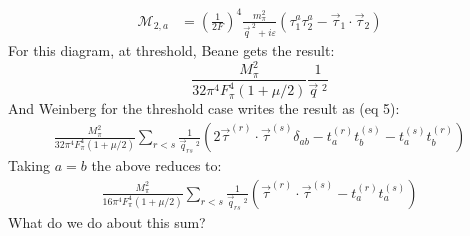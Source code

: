 \documentclass[11pt]{article}
\newcommand\ddfrac[2]{\frac{\displaystyle #1}{\displaystyle #2}}
\newcommand{\note}[1]{\color{red} #1 \color{black}}
\newcommand\mm{\mathcal{M}}
\begin{document}
\begin{align}
    \mm_{2,a} &= \left( \frac{1}{2 F}  \right)^4 
    \ddfrac{m_\pi^2}{\vec{q}^{\;2}+i \varepsilon} \left( \tau_1^a \tau_2^a-\vec{\tau}_1 \cdot \vec{\tau}_2 \right)
\end{align}
For this diagram, at threshold, Beane gets the result:
\begin{equation}
    \frac{M_\pi^2}{32\pi^4 F_\pi^4 (1+ \mu/2)} \frac{1}{\vec{q}\;^2} 
\end{equation}
And Weinberg for the threshold case writes the result as (eq 5):
\begin{align}
    \frac{M_\pi^2}{32\pi^4 F_\pi^4 (1+ \mu/2)}\sum_{r<s} \frac{1}{\vec{q}_{rs}\;^2}  \left( 2 \vec{\tau}^{(r)} \cdot \vec{\tau}^{(s)} \delta_{ab}-t_a^{(r)} t_b^{(s)} - t_a^{(s)} t_b^{(r)} \right)
\end{align}
Taking $a=b$ the above reduces to:
\begin{align}
    \frac{M_\pi^2}{16\pi^4 F_\pi^4 (1+ \mu/2)}\sum_{r<s} \frac{1}{\vec{q}_{rs}\;^2}  \left( \vec{\tau}^{(r)} \cdot \vec{\tau}^{(s)}-t_a^{(r)} t_a^{(s)}\right)
\end{align}
\note{What do we do about this sum?}
\end{document}
